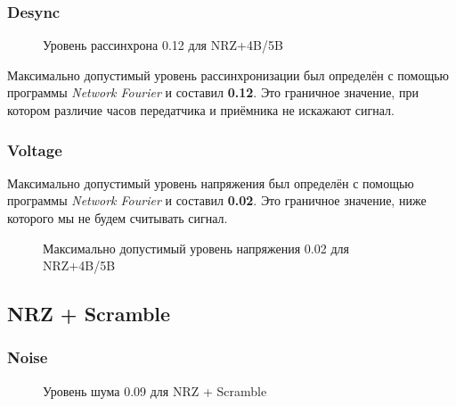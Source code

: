 \subsubsection{Desync}

\vspace{-0.2cm}
\begin{wrapfigure}{r}{0.65\textwidth}
	\centering
	\caption{Уровень рассинхрона 0.12 для NRZ+4B/5B}
	\vspace{-125pt}
\end{wrapfigure}

Максимально допустимый уровень рассинхронизации был определён с помощью программы \textit{Network Fourier} и составил \textbf{0.12}. Это граничное значение, при котором различие часов передатчика и приёмника не искажают сигнал.
\thispagestyle{empty}

\newpage

\subsubsection{Voltage}
Максимально допустимый уровень напряжения был определён с помощью программы \textit{Network Fourier} и составил \textbf{0.02}. Это граничное значение, ниже которого мы не будем считывать сигнал.

\vspace{0.4cm}
\begin{figure}[h]
	\centering
	\caption{Максимально допустимый уровень напряжения 0.02 для NRZ+4B/5B}
\end{figure}





\subsection{NRZ + Scramble}

\subsubsection{Noise}

\vspace{-0.2cm}
\begin{wrapfigure}{r}{0.65\textwidth}
    \centering
    \caption{Уровень шума 0.09 для NRZ + Scramble}
    \vspace{-5cm}
\end{wrapfigure}
\thispagestyle{empty}

